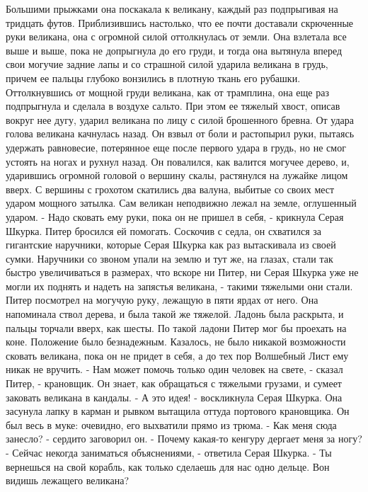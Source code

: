     Большими прыжками она поскакала к великану, каждый раз подпрыгивая 
на тридцать футов. Приблизившись настолько, что ее почти доставали 
скрюченные руки великана, она с огромной силой оттолкнулась от земли. 
Она взлетала все выше и выше, пока не допрыгнула до его груди, и тогда 
она вытянула вперед свои могучие задние лапы и со страшной силой 
ударила великана в грудь, причем ее пальцы глубоко вонзились в плотную 
ткань его рубашки. Оттолкнувшись от мощной груди великана, как от 
трамплина, она еще раз подпрыгнула и сделала в воздухе сальто. При 
этом ее тяжелый хвост, описав вокруг нее дугу, ударил великана по лицу 
с силой брошенного бревна.
    От удара голова великана качнулась назад. Он взвыл от боли и 
растопырил руки, пытаясь удержать равновесие, потерянное еще после 
первого удара в грудь, но не смог устоять на ногах и рухнул назад. Он 
повалился, как валится могучее дерево, и, ударившись огромной головой 
о вершину скалы, растянулся на лужайке лицом вверх. С вершины с 
грохотом скатились два валуна, выбитые со своих мест ударом мощного 
затылка. Сам великан неподвижно лежал на земле, оглушенный ударом.
    - Надо сковать ему руки, пока он не пришел в себя, - крикнула 
Серая Шкурка.
    Питер бросился ей помогать. Соскочив с седла, он схватился за 
гигантские наручники, которые Серая Шкурка как раз вытаскивала из 
своей сумки. Наручники со звоном упали на землю и тут же, на глазах, 
стали так быстро увеличиваться в размерах, что вскоре ни Питер, ни 
Серая Шкурка уже не могли их поднять и надеть на запястья великана, - 
такими тяжелыми они стали.
    Питер посмотрел на могучую руку, лежащую в пяти ярдах от него. Она 
напоминала ствол дерева, и была такой же тяжелой. Ладонь была 
раскрыта, и пальцы торчали вверх, как шесты. По такой ладони Питер мог 
бы проехать на коне.
    Положение было безнадежным. Казалось, не было никакой возможности 
сковать великана, пока он не придет в себя, а до тех пор Волшебный 
Лист ему никак не вручить.
    - Нам может помочь только один человек на свете, - сказал Питер, - 
крановщик. Он знает, как обращаться с тяжелыми грузами, и сумеет 
заковать великана в кандалы.
    - А это идея! - воскликнула Серая Шкурка. Она засунула лапку в 
карман и рывком вытащила оттуда портового крановщика. Он был весь в 
муке: очевидно, его выхватили прямо из трюма.
    - Как меня сюда занесло? - сердито заговорил он. - Почему какая-то 
кенгуру дергает меня за ногу?
    - Сейчас некогда заниматься объяснениями, - ответила Серая Шкурка. 
- Ты вернешься на свой корабль, как только сделаешь для нас одно 
дельце. Вон видишь лежащего великана?
